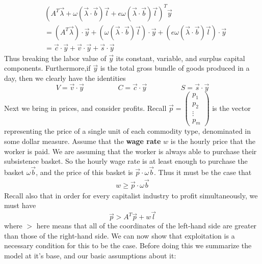 \documentclass{article}
\theoremstyle{definition}
\theoremstyle{plain}
\theoremstyle{theorem}
\begin{document}
\begin{align*}
	& (A^T\vec{\lambda} + \omega(\vec{\lambda}\cdot\vec{b})\vec{l} + e\omega(\vec{\lambda}\cdot\vec{b})\vec{l})^T\vec{y}  \\
	&= (A^T\vec{\lambda})\cdot\vec{y} + (\omega(\vec{\lambda}\cdot\vec{b})\vec{l})\cdot \vec{y} + (e\omega(\vec{\lambda}\cdot\vec{b})\vec{l})\cdot\vec{y} \\
	&= \vec{c} \cdot \vec{y} + \vec{v}\cdot \vec{y} + \vec{s}\cdot \vec{y}
\end{align*}
Thus breaking the labor value of $\vec{y}$ its constant, variable, and surplus capital components. Furthermore,if $\vec{y}$ is the total gross bundle of goods produced in a day, then we clearly have the identities
\[ V = \vec{v} \cdot \vec{y} \hspace{2cm} C = \vec{c}\cdot \vec{y} \hspace{2cm} S = \vec{s}\cdot \vec{y} \]  
Next we bring in prices, and consider profits. Recall $\vec{p} = \begin{pmatrix} p_1 \\ p_2 \\ \vdots \\ p_m \end{pmatrix}$ is the vector representing the price of a single unit of each commodity type, denominated in some dollar measure. Assume that the \textbf{wage rate} $w$ is the hourly price that the worker is paid. We are assuming that the worker is always able to purchase their subsistence basket. So the hourly wage rate is at least enough to purchase the basket $\omega \vec{b}$, and the price of this basket is $\vec{p} \cdot \omega \vec{b}$. Thus it must be the case that
\begin{align}
	w \geq \vec{p} \cdot \omega \vec{b}  \label{suffWages}
\end{align} 
 Recall also that in order for every capitalist industry to profit simultaneously, we must have 
 \[ \vec{p} > A^T\vec{p} + w\vec{l} \]
where $>$ here means that all of the coordinates of the left-hand side are greater than those of the right-hand side. We can now show that exploitation is a necessary condition for this to be the case. Before doing this we summarize the model at it's base, and our basic assumptions about it: \par 
\end{document}
